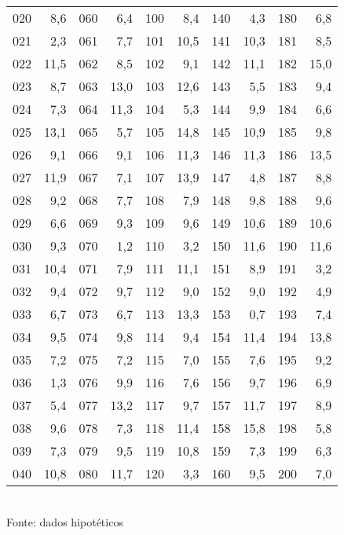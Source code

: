 \begin{table}[!htb]
\begin{tabular}{lrlrlrlrlr}
020 & 8,6 & 060 & 6,4 & 100 & 8,4 & 140 & 4,3 & 180 & 6,8 \\
021 & 2,3 & 061 & 7,7 & 101 & 10,5 & 141 & 10,3 & 181 & 8,5  \\
022 & 11,5 & 062 & 8,5 & 102 & 9,1 & 142 & 11,1 & 182 & 15,0  \\
023 & 8,7 & 063 & 13,0 & 103 & 12,6 & 143 & 5,5 & 183 & 9,4  \\
024 & 7,3 & 064 & 11,3 & 104 & 5,3 & 144 & 9,9 & 184 & 6,6  \\
025 & 13,1 & 065 & 5,7 & 105 & 14,8 & 145 & 10,9 & 185 & 9,8  \\
026 & 9,1 & 066 & 9,1 & 106 & 11,3 & 146 & 11,3 & 186 & 13,5  \\
027 & 11,9 & 067 & 7,1 & 107 & 13,9 & 147 & 4,8 & 187 & 8,8  \\
028 & 9,2 & 068 & 7,7 & 108 & 7,9 & 148 & 9,8 & 188 & 9,6  \\
029 & 6,6 & 069 & 9,3 & 109 & 9,6 & 149 & 10,6 & 189 & 10,6  \\
030 & 9,3 & 070 & 1,2 & 110 & 3,2 & 150 & 11,6 & 190 & 11,6 \\
031 & 10,4 & 071 & 7,9 & 111 & 11,1 & 151 & 8,9 & 191 & 3,2  \\
032 & 9,4 & 072 & 9,7 & 112 & 9,0 & 152 & 9,0 & 192 & 4,9  \\
033 & 6,7 & 073 & 6,7 & 113 & 13,3 & 153 & 0,7 & 193 & 7,4  \\
034 & 9,5 & 074 & 9,8 & 114 & 9,4 & 154 & 11,4 & 194 & 13,8  \\
035 & 7,2 & 075 & 7,2 & 115 & 7,0 & 155 & 7,6 & 195 & 9,2  \\
036 & 1,3 & 076 & 9,9 & 116 & 7,6 & 156 & 9,7 & 196 & 6,9  \\
037 & 5,4 & 077 & 13,2 & 117 & 9,7 & 157 & 11,7 & 197 & 8,9  \\
038 & 9,6 & 078 & 7,3 & 118 & 11,4 & 158 & 15,8 & 198 & 5,8  \\
039 & 7,3 & 079 & 9,5 & 119 & 10,8 & 159 & 7,3 & 199 & 6,3  \\
040 & 10,8 & 080 & 11,7 & 120 & 3,3 & 160 & 9,5 & 200 & 7,0  \\
\hline 
\end{tabular} 
\\ Fonte: dados hipotéticos
\endgroup
\end{table}
